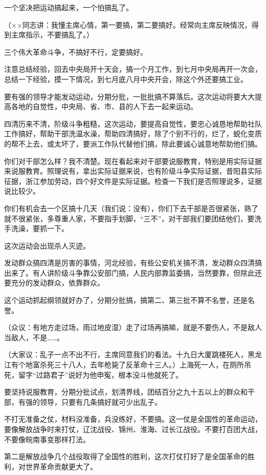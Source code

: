 一个坚决把运动搞起来，一个怕搞乱了。

（××同志讲：我懂主席心情，第一要搞，第二要搞好。经常向主席反映情况，得到主席指示，不要搞乱了。）

三个伟大革命斗争，不搞好不行，定要搞好。

注意总结经验，回去中央局开十天会，搞一个月工作，到七月中央局再开一次会，总结一下经验，摸一下情况，到七月底八月中央开会，除这个外还要搞工业。

要有强的领导才能发动运动，分期分批，一批批搞不算落后。这次运动将要大大提高各地的自觉性，中央局、省、市、县的人下去一起来运动。

四清历来不清，阶级斗争粗糙，这次运动，要提高自觉性，要忠心诚恳地帮助社队工作搞好，帮助干部洗温水澡，帮助四清搞好，除了个别不行的，烂了，蜕化变质的帮不上去，或太坏了，要派工作队代替他们搞，除此要诚心诚意地帮助他们搞。

你们对干部怎么样？我不清楚。现在看起来对干部要说服教育，特别是用实际证据来说服教育。照理说有，拿出实际证据来说，也有阶级斗争实际证据，昔阳县实际征据，浙江参加劳动，四个好文件是实际证据。检查一下我们是否照理说多，证据说比较少。

你们有机会去一个区搞十几天（我们说：没有），你们下去干部是否很紧张，熟了就不很紧张，多尊重人家，不要指手划脚，“三不”，对干部我们要团结他们，要洗手洗澡，要抓一下。

这次运动会出现杀人灭迹。

发动群众搞四清是厉害的事情，河北经验，有些公安机关搞不清，发动群众四清搞出来了。有人讲阶级斗争靠公安部门搞，人民内部靠监委搞，当然要靠，但除此还要充分的发动群众，依靠群众。

这个运动抓起纲领就好办了，分期分批搞，搞第二、第三批不算不名誉，还是名誉。

（众议：有地方走过场，雨过地皮湿）走了过场再搞嘛，就是不要伤人，不是敌人当敌人，不是……。

（大家议：乱子一点不出不行，主席同意我们的看法。十九日大厦跳楼死人，黑龙江有个地富杀死三十八人，去年枪毙了反革命十三人。）上海死一人，在厕所吊死，留字“过路君子”说好为他申寃，根本没斗他就死了。

要坚持说服教育，分期分批试点，划清界线，团结百分之九十五以上的群众和干部，有强的领导，只要有几条搞好就可少出乱子。

不打无准备之仗，材料没准备，兵没练好，不要搞。这一仗是全国性的革命运动，要像解放战争时来打仗，辽沈战役、锦州、淮海、过长江战役。不要打百团大战，不要像皖南事变那样打法。

第二是解放战争几个战役取得了全国性的胜利，这次打仗打好了是全国革命的胜利，对世界革命贡献更大了。

